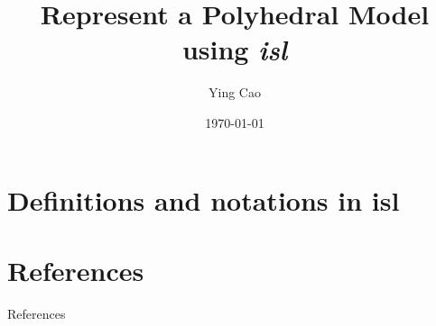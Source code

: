\documentclass[10pt,aspectratio=43,mathserif]{beamer}
\title[] {Represent a Polyhedral Model using \textit{isl}}
\author{Ying Cao}
\institute {}
\date{\today}
\begin{document}

\begin {frame}
\titlepage
\end {frame}


\section{Definitions and notations in isl}


% 

\section{References}
\begin{frame}[allowframebreaks]{References}


\end{frame}

\end{document}
